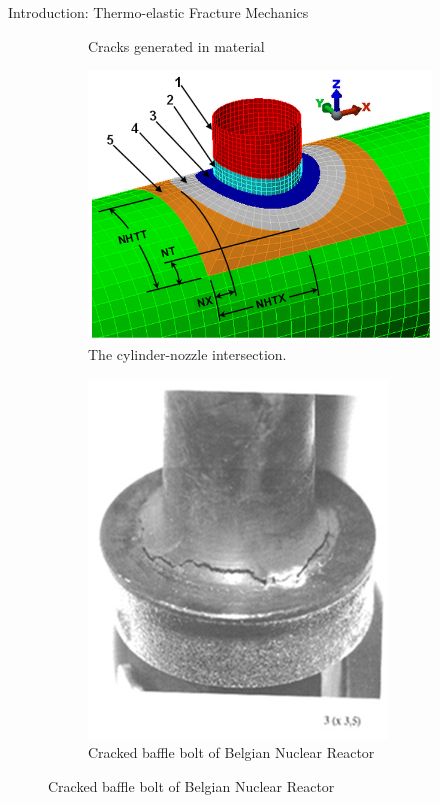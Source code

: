 \documentclass{beamer}
\begin{document}
\begin{frame}[t,fragile]{Introduction: Thermo-elastic Fracture Mechanics}
\begin{itemize}
\begin{figure}[H]
\begin{subfigure}{0.45\textwidth}
 \vspace{-.2cm}
 \caption{\tiny Cracks generated in material}
 \end{subfigure}
       \vspace{-.3cm}
      \begin{subfigure}{0.45\textwidth}
    \centering
     \includegraphics[scale=.1]{cyl.png}
 \vspace{-.2cm}
 \caption{\tiny{The cylinder-nozzle intersection.}}
 \label{cyl}
 \end{subfigure}
\begin{subfigure}{0.45\textwidth}
    \centering
     \includegraphics[scale=.1]{fail.jpg}
 \vspace{-.2cm}
 \caption{\tiny{Cracked baffle bolt of Belgian Nuclear Reactor}}

\end{subfigure}
\end{figure}
\end{itemize}
\end{frame}
\end{document}
